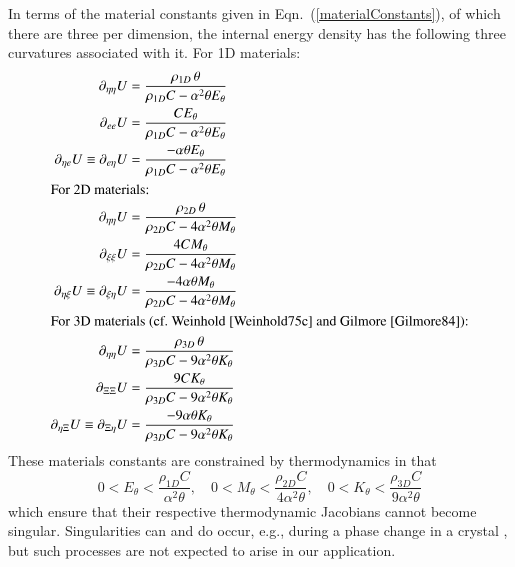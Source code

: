 In terms of the material constants given in Eqn.~(\ref{materialConstants}), of which there are three per dimension, the internal energy density has the following three curvatures associated with it.  For 1D materials:
\begin{subequations}
    \label{internalEnergies}
    \begin{align}
    \partial_{\eta\eta} U & = 
    \frac{\rho_{1D} \, \theta}
    {\rho_{1D} C - \alpha^2 \theta E_{\theta}} \\
    \partial_{ee} U & = \frac{C E_{\theta}}
    {\rho_{1D} C - \alpha^2 \theta E_{\theta}} \\
    \partial_{\eta e} U \equiv \partial_{e \eta} U & = 
    \frac{-\alpha \theta E_{\theta}}
    {\rho_{1D} C - \alpha^2 \theta E_{\theta}} \\
    \intertext{For 2D materials:}
    \partial_{\eta\eta} U & = 
    \frac{\rho_{2D} \, \theta}
    {\rho_{2D} C - 4 \alpha^2 \theta M_{\theta}} \\
    \partial_{\xi\xi} U & = \frac{4 C M_{\theta}}
    {\rho_{2D} C - 4 \alpha^2 \theta M_{\theta}} \\
    \partial_{\eta \xi} U \equiv \partial_{\xi \eta} U & = 
    \frac{-4 \alpha \theta M_{\theta}}
    {\rho_{2D} C - 4 \alpha^2 \theta M_{\theta}} \\
    \intertext{For 3D materials (cf.\ Weinhold \cite{Weinhold75c} and Gilmore \cite{Gilmore84}):}
    \partial_{\eta\eta} U & = 
    \frac{\rho_{3D} \, \theta}
    {\rho_{3D} C - 9 \alpha^2 \theta K_{\theta}} \\
    \partial_{\Xi\Xi} U & = \frac{9 C K_{\theta}}
    {\rho_{3D} C - 9 \alpha^2 \theta K_{\theta}} \\
    \partial_{\eta\Xi} U \equiv 
    \partial_{\Xi\eta} U & = 
    \frac{-9 \alpha \theta K_{\theta}}
    {\rho_{3D} C - 9 \alpha^2 \theta K_{\theta}}
    \end{align}
\end{subequations}
These materials constants are constrained by thermo\-dynamics in that
\begin{equation}
    \label{thermodynamicConstraints}
    0 < E_{\theta} < \frac{\rho_{1D} C}{\alpha^2 \theta} , \quad
    0 < M_{\theta} < \frac{\rho_{2D} C}{4 \alpha^2 \theta} , \quad
    0 < K_{\theta} < \frac{\rho_{3D} C}{9 \alpha^2 \theta} 
\end{equation} 
which ensure that their respective thermo\-dynamic Jacobians cannot become singular. Singularities can and do occur, e.g., during a phase change in a crystal \cite{McLellan76,Gilmore84}, but such processes are not expected to arise in our application.

